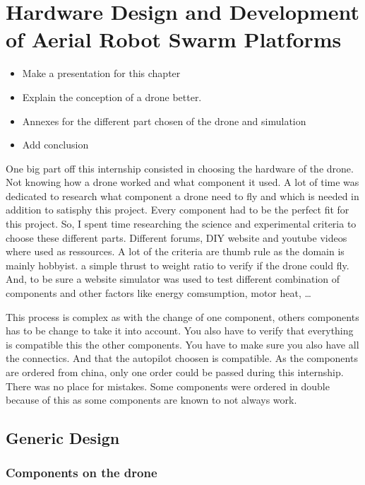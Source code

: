 \chapter{Hardware Design and Development of Aerial Robot Swarm Platforms}

{\color{red}
\begin{itemize}
    \item Make a presentation for this chapter
    \item Explain the conception of a drone better.
    \item Annexes for the different part chosen of the drone and simulation
    \item Add conclusion
\end{itemize}
}

One big part off this internship consisted in choosing the hardware of the drone.
Not knowing how a drone worked and what component it used.
A lot of time was dedicated to research what component a drone need to fly and which is needed in addition to satisphy this project.
Every component had to be the perfect fit for this project.
So, I spent time researching the science and experimental criteria to choose these different parts.
Different forums, DIY website and youtube videos where used as ressources.
A lot of the criteria are thumb rule as the domain is mainly hobbyist.
a simple thrust to weight ratio to verify if the drone could fly.
And, to be sure a website simulator was used to test different combination of components and other factors like energy comsumption,
motor heat, …

This process is complex as with the change of one component, others components has to be change to take it into account.
You also have to verify that everything is compatible this the other components.
You have to make sure you also have all the connectics.
And that the autopilot choosen is compatible.
As the components are ordered from china, only one order could be passed during this internship.
There was no place for mistakes.
Some components were ordered in double because of this as some components are known to not always work.

\section{Generic Design}

\subsection{Components on the drone}

